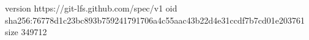 version https://git-lfs.github.com/spec/v1
oid sha256:76778d1c23bc893b759241791706a4c55aac43b22d4e31ccdf7b7cd01e203761
size 349712

